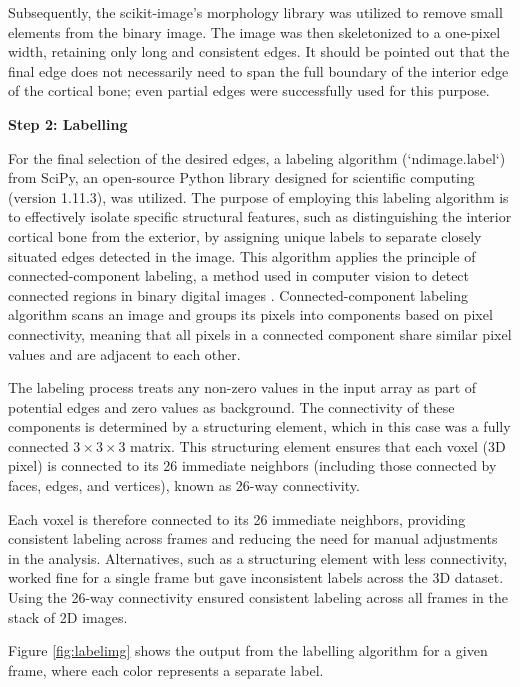 \documentclass{micro-econ-thesis}
\begin{document}
Subsequently, the scikit-image's morphology library was utilized to remove small elements from the binary image. The image was then skeletonized to a one-pixel width, retaining only long and consistent edges. It should be pointed out that the final edge does not necessarily need to span the full boundary of the interior edge of the cortical bone; even partial edges were successfully used for this purpose.  

\textbf{Step 2: Labelling}

For the final selection of the desired edges, a labeling algorithm (`ndimage.label`) from SciPy, an open-source Python library designed for scientific computing (version 1.11.3), was utilized. The purpose of employing this labeling algorithm is to effectively isolate specific structural features, such as distinguishing the interior cortical bone from the exterior, by assigning unique labels to separate closely situated edges detected in the image. This algorithm applies the principle of connected-component labeling, a method used in computer vision to detect connected regions in binary digital images \parencite{dillencourt_general_1992}. Connected-component labeling algorithm scans an image and groups its pixels into components based on pixel connectivity, meaning that all pixels in a connected component share similar pixel values and are adjacent to each other.

The labeling process treats any non-zero values in the input array as part of potential edges and zero values as background. The connectivity of these components is determined by a structuring element, which in this case was a fully connected $3\times3\times3$ matrix. This structuring element ensures that each voxel (3D pixel) is connected to its 26 immediate neighbors (including those connected by faces, edges, and vertices), known as 26-way connectivity.

Each voxel is therefore connected to its 26 immediate neighbors, providing consistent labeling across frames and reducing the need for manual adjustments in the analysis. Alternatives, such as a structuring element with less connectivity, worked fine for a single frame but gave inconsistent labels across the 3D dataset. Using the 26-way connectivity ensured consistent labeling across all frames in the stack of 2D images. 

Figure \ref{fig:labelimg} shows the output from the labelling algorithm for a given frame, where each color represents a separate label. 
\end{document}
